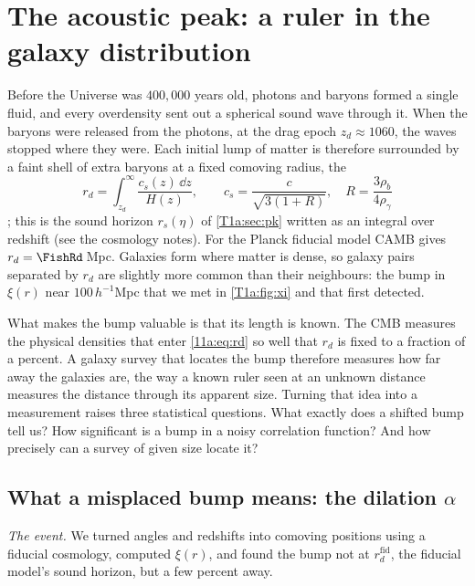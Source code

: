 \section{The acoustic peak: a ruler in the galaxy distribution}
\label{11a:sec:bao}

Before the Universe was $400{,}000$ years old, photons and baryons formed a single
fluid, and every overdensity sent out a spherical sound wave through it. When the
baryons were released from the photons, at the drag epoch $z_d\approx1060$, the
waves stopped where they were. Each initial lump of matter is therefore
surrounded by a faint shell of extra baryons at a fixed comoving radius, the
\begin{equation}
  r_d=\int_{z_d}^{\infty}\frac{c_s(z)\,\dd z}{H(z)},\qquad
  c_s=\frac{c}{\sqrt{3(1+R)}},\quad R=\frac{3\rho_b}{4\rho_\gamma}
  \label{11a:eq:rd}
\end{equation}
; this is the sound horizon $r_s(\eta)$ of
\cref{T1a:sec:pk} written as an integral over redshift (see the cosmology notes).
For the Planck fiducial model CAMB gives $r_d=\FishRd$\,Mpc. Galaxies form where
matter is dense, so galaxy pairs separated by $r_d$ are slightly more common than
their neighbours: the bump in $\xi(r)$ near $100\,h^{-1}$Mpc that we met in
\cref{T1a:fig:xi} and that \cite{Eisenstein2005} first detected.

What makes the bump valuable is that its length is known. The CMB measures the
physical densities that enter \eqref{11a:eq:rd} so well that $r_d$ is fixed to a
fraction of a percent. A galaxy survey that locates the bump therefore measures
how far away the galaxies are, the way a known ruler seen at an unknown distance
measures the distance through its apparent size. Turning that idea into a
measurement raises three statistical questions. What exactly does a shifted bump tell us? How significant is a bump in a
noisy correlation function? And how precisely can a survey of given size locate
it?

\subsection{What a misplaced bump means: the dilation \texorpdfstring{$\alpha$}{alpha}}
\label{11a:sec:alpha}

\emph{The event.} We turned angles and redshifts into comoving positions using a
fiducial cosmology, computed $\xi(r)$, and found the bump not at
$r_d^{\mathrm{fid}}$, the fiducial model's sound horizon, but a few percent away.

